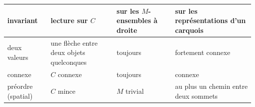 \begin{center}\small
\begin{tabularx}{\linewidth}{>{\raggedright\arraybackslash}p{2.6cm}>{\raggedright\arraybackslash}p{3.2cm}>{\raggedright\arraybackslash}X>{\raggedright\arraybackslash}X}
\toprule
invariant & lecture sur $C$ & sur les $M$-ensembles à droite & sur les représentations d'un carquois\\
\midrule
deux valeurs & une flèche entre deux objets quelconques & toujours & fortement connexe\\
connexe & $C$ connexe & toujours & connexe\\
préordre (spatial) & $C$ mince & $M$ trivial & au plus un chemin entre deux sommets\\
\bottomrule
\end{tabularx}
\end{center}

